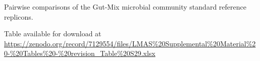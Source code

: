 \begin{table}[]
\centering
\caption{Pairwise comparisons of the Gut-Mix microbial community standard reference replicons.}
\label{tab:ch5_suptable29}
Table available for download at \url{https://zenodo.org/record/7129554/files/LMAS\%20Supplemental\%20Material\%20-\%20Tables\%20-\%20revision_Table\%20S29.xlsx}
\end{table}